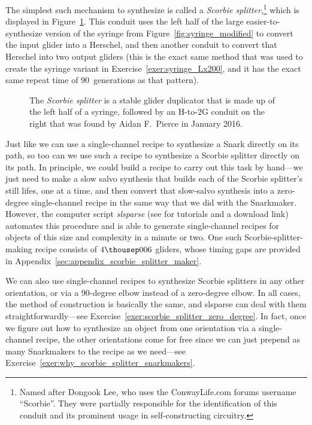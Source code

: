 The simplest such mechanism to synthesize is called a \emph{Scorbie splitter},\footnote{Named after Dongook Lee, who uses the ConwayLife.com forums username ``Scorbie''. They were partially responsible for the identification of this conduit and its prominent usage in self-constructing circuitry.} which is displayed in Figure~\ref{fig:scorbie_splitter}. This conduit uses the left half of the large easier-to-synthesize version of the syringe from Figure~\ref{fig:syringe_modified} to convert the input glider into a Herschel, and then another conduit to convert that Herschel into two output gliders (this is the exact same method that was used to create the syringe variant in Exercise~\ref{exer:syringe_Lx200}, and it has the exact same repeat time of $90$~generations as that pattern).

\begin{figure}[!htb]
	\centering
	\caption{The \emph{Scorbie splitter} is a stable glider duplicator that is made up of the left half of a syringe, followed by an H-to-2G conduit on the right that was found by Aidan F.~Pierce in January 2016.}
	\label{fig:scorbie_splitter}
\end{figure}

Just like we can use a single-channel recipe to synthesize a Snark directly on its path, so too can we use such a recipe to synthesize a Scorbie splitter directly on its path. In principle, we could build a recipe to carry out this task by hand---we just need to make a slow salvo synthesis that builds each of the Scorbie splitter's still lifes, one at a time, and then convert that slow-salvo synthesis into a zero-degree single-channel recipe in the same way that we did with the Snarkmaker. However, the computer script \emph{slsparse} (see  for tutorials and a download link) automates this procedure and is able to generate single-channel recipes for objects of this size and complexity in a minute or two. One such Scorbie-splitter-making recipe consists of $4{\thousep}006$ gliders, whose timing gaps are provided in Appendix~\ref{sec:appendix_scorbie_splitter_maker}.

We can also use single-channel recipes to synthesize Scorbie splitters in any other orientation, or via a 90-degree elbow instead of a zero-degree elbow. In all cases, the method of construction is basically the same, and slsparse can deal with them straightforwardly---see Exercise~\ref{exer:scorbie_splitter_zero_degree}. In fact, once we figure out how to synthesize an object from one orientation via a single-channel recipe, the other orientations come for free since we can just prepend as many Snarkmakers to the recipe as we need---see Exercise~\ref{exer:why_scorbie_splitter_snarkmakers}.


